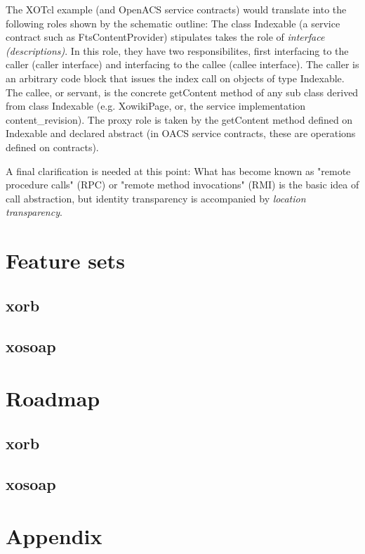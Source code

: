 The XOTcl example (and OpenACS service contracts) would translate into the following roles shown by the schematic outline: The class Indexable (a service contract such as FtsContentProvider) stipulates takes the role of \emph{interface (descriptions)}. In this role, they have two responsibilites, first interfacing to the caller (caller interface) and interfacing to the callee (callee interface). The caller is an arbitrary code block that issues the index call on objects of type Indexable. The callee, or servant, is the concrete getContent method of any sub class derived from class Indexable (e.g. XowikiPage, or, the service implementation content\_revision). The proxy role is taken by the getContent method defined on Indexable and declared abstract (in OACS service contracts, these are operations defined on contracts).

A final clarification is needed at this point: What has become known as "remote procedure calls" (RPC) or "remote method invocations" (RMI) is the basic idea of call abstraction, but identity transparency is accompanied by \emph{location transparency}.

  \section{Feature sets}
  \subsection{xorb}
  \subsection{xosoap}
  \section{Roadmap}
   \subsection{xorb}	
  \subsection{xosoap}
  \section{Appendix} 
